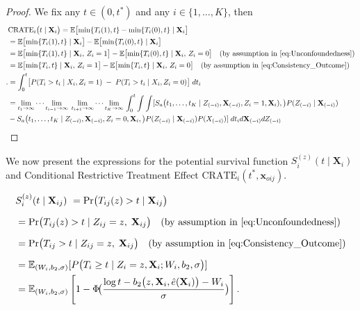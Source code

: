 \documentclass[aoas]{imsart}
\theoremstyle{plain}
\theoremstyle{definition}
\begin{document}
\begin{proof}

We fix any $t \in (0, t^*)$ and any $ i \in \{1,\dots,K\}$, then
\begin{align}
\nonumber &\text{CRATE}_i\bigl(t\mid \mathbf{X}_{i}\bigr)
= \mathbb{E}\bigl[\min\{T_i(1),t\}-\min\{T_i(0),t\}\mid \mathbf{X}_{i}\bigr]\\ \nonumber 
&= \mathbb{E}\bigl[\min\{T_i(1),t\}\mid \mathbf{X}_{i}\bigr]
 - \mathbb{E}\bigl[\min\{T_i(0),t\}\mid \mathbf{X}_{i}\bigr]\\ \nonumber 
&= \mathbb{E}\bigl[\min\{T_i(1),t\}\mid \mathbf{X}_{i},\,Z_{i}=1\bigr]
 - \mathbb{E}\bigl[\min\{T_i(0),t\}\mid \mathbf{X}_{i},\,Z_{i}=0\bigr] \quad (\text{by assumption in \eqref{eq:Unconfoundedness}}) \\ \nonumber 
&= \mathbb{E}\bigl[\min\{T_i,t\}\mid \mathbf{X}_{i},\,Z_{i}=1\bigr]
 - \mathbb{E}\bigl[\min\{T_i,t\}\mid \mathbf{X}_{i},\,Z_{i}=0\bigr] \quad (\text{by assumption in \eqref{eq:Consistency_Outcome}})\\ \nonumber.
&=\int_{0}^{t}\bigl[P(T_i>t_i\mid X_i,Z_i=1)\;-\;P(T_i>t_i\mid X_i,Z_i=0)\bigr]\;dt_i \\ \nonumber
&= \lim_{t_1\to\infty}\cdots\lim_{t_{i-1}\to\infty}
\;\lim_{t_{i+1}\to\infty}\cdots\lim_{t_K\to\infty}\,
\int_{0}^{t} \int \int
[S_a\bigl(t_1,\dots,t_K \mid Z_{(-i)},\mathbf X_{(-i)},Z_i=1,\mathbf{X}_i),\bigr)P(Z_{(-i)} \mid \mathbf X_{(-i)})\\ \nonumber
&-S_a\bigl(t_1,\dots,t_K \mid Z_{(-i)},\mathbf X_{(-i)},Z_i=0,\mathbf{X}_i,\bigr)P(Z_{(-i)} \mid \mathbf X_{(-i)}) P(X_{(-i)})]\;dt_i d\mathbf{X}_{(-i)} dZ_{(-i)}
\end{align}
    
\end{proof}
We now present the expressions for the potential survival function $S^{(z)}_i(t \mid \mathbf{X}_{i})$ and Conditional Restrictive Treatment Effect ${\text{CRATE}_i}(t^*, \mathbf{x}_{oij}) $.

\begin{align*}
&S_i^{(z)}(t\mid \mathbf X_{ij}) \ 
= \Pr\bigl(T_{ij}{(z)}>t \mid \mathbf X_{ij}\bigr) \\[6pt]
&= \Pr\bigl(T_{ij}(z)>t \mid Z_{ij}=z,\;\mathbf X_{ij}\bigr)
   \quad (\text{by assumption in \eqref{eq:Unconfoundedness}}) \\[6pt]
&= \Pr\bigl(T_{ij}>t \mid Z_{ij}=z,\;\mathbf X_{ij}\bigr)
   \quad (\text{by assumption in \eqref{eq:Consistency_Outcome}}) \\[6pt]
&= \mathbb{E}_{(W_i,b_2,\sigma)}[P\bigl(T_{i}\ge t \mid Z_{i}=z,\mathbf{X}_{i};W_i,b_2,\sigma\bigr)]\\
&=\mathbb{E}_{(W_i,b_2,\sigma)}\left[ 1 - \Phi\!\bigr(\frac{\log t - b_2\bigl(z,\mathbf{X}_{i},\hat e(\mathbf{X}_{i})\bigr) - W_i}{\sigma}\bigr)\right].
\end{align*}
\end{document}
